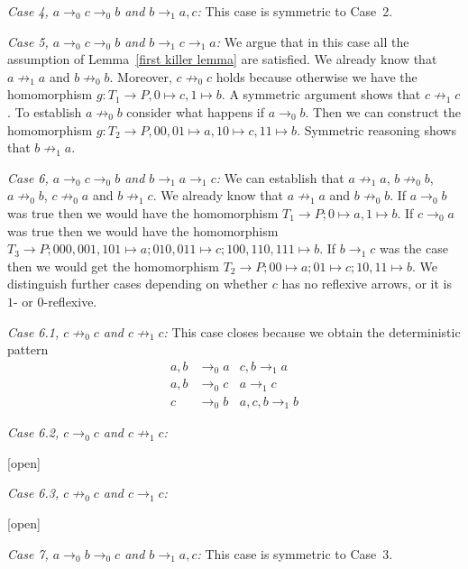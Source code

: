 \documentclass[a4paper]{article}
\newcommand{\case}[2]{\vspace{1ex}\noindent\textit{Case #1, #2:}}
\begin{document}
\case{4}{$a \rightarrow_0 c \rightarrow_0 b$ and $b \rightarrow_1 a,c$}
This case is symmetric to Case~2.

\case{5}{$a \rightarrow_0 c \rightarrow_0 b$ and $b \rightarrow_1 c
\rightarrow_1 a$}
We argue that in this case all the assumption of Lemma~\ref{first killer
lemma} are satisfied. We already know that $a \not \rightarrow_1 a$ and
$b \not \rightarrow_0 b$. Moreover, $c \not \rightarrow_0 c$ holds
because otherwise we have the homomorphism $g : T_1 \to P, 0 \mapsto c,
1 \mapsto b$. A symmetric argument shows that $c \not \rightarrow_1 c$.
To establish $a \not \rightarrow_0 b$ consider what happens if $a
\rightarrow_0 b$. Then we can construct the homomorphism $g : T_2 \to P,
00, 01 \mapsto a, 10 \mapsto c, 11 \mapsto b$. Symmetric reasoning shows
that $b \not \rightarrow_1 a$.

\case{6}{$a \rightarrow_0 c \rightarrow_0 b$ and $b \rightarrow_1 a
\rightarrow_1 c$}
We can establish that $a \not \rightarrow_1 a$, $b \not \rightarrow_0
b$, $a \not \rightarrow_0 b$, $c \not \rightarrow_0 a$ and $b \not
\rightarrow_1 c$. We already know that $a \not \rightarrow_1 a$ and $b
\not \rightarrow_0 b$. If $a \rightarrow_0 b$ was true then we would
have the homomorphism $T_1 \to P; 0 \mapsto a, 1 \mapsto b$. If $c
\rightarrow_0 a$ was true then we would have the homomorphism $T_3 \to
P; 000,001,101 \mapsto a; 010,011 \mapsto c; 100,110,111 \mapsto b$. If
$b \rightarrow_1 c$ was the case then we would get the homomorphism $T_2
\to P; 00 \mapsto a; 01 \mapsto c; 10,11 \mapsto b$. We distinguish
further cases depending on whether $c$ has no reflexive arrows, or it
is $1$- or $0$-reflexive.

\case{6.1}{$c \not \rightarrow_0 c$ and $c \not \rightarrow_1 c$}
This case closes because we obtain the deterministic pattern
\begin{align*}
 a,b & \rightarrow_0 a & c,b \rightarrow_1 a \\
 a,b & \rightarrow_0 c & a \rightarrow_1 c \\
 c & \rightarrow_0 b & a,c,b \rightarrow_1 b
\end{align*}

\case{6.2}{$c \rightarrow_0 c$ and $c \not \rightarrow_1 c$}

[open]

\case{6.3}{$c \not \rightarrow_0 c$ and $c \rightarrow_1 c$}

[open]


\case{7}{$a \rightarrow_0 b \rightarrow_0 c$ and $b \rightarrow_1 a,c$}
This case is symmetric to Case~3.
\end{document}
